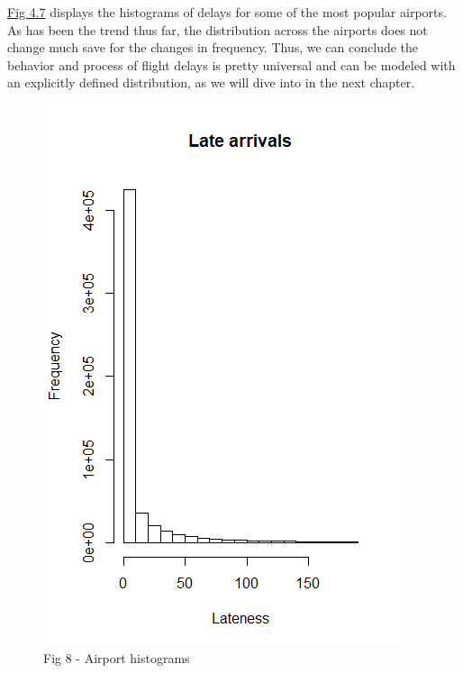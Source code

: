 \documentclass[12pt, a4paper, openany]{book}
\newcommand\tab[1][1cm]{\hspace*{#1}}
\begin{document}
			\tab \underline{Fig 4.7} displays the histograms of delays for some of the most popular airports. As has been the trend thus far, the distribution across the airports does not change much save for the changes in frequency. Thus, we can conclude the behavior and process of flight delays is pretty universal and can be modeled with an explicitly defined distribution, as we will dive into in the next chapter. \\ 
			\begin{figure}[h]
	 		\includegraphics[width = 1 \textwidth]{../figures/LateArrivalsHistogram}
	 		\caption{Fig 8 - Airport histograms}
	 		\end{figure}
\end{document}
